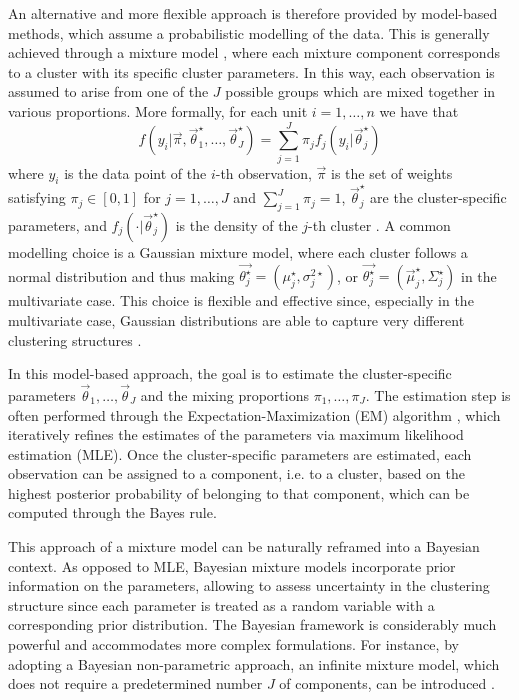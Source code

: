 \documentclass[12pt,	%
	a4paper,		%
	twoside,		%
	openright,		%
	titlepage,%
	]{book}
\theoremstyle{definition}
\let\cite\citep
\begin{document}
An alternative and more flexible approach is therefore provided by model-based methods, which assume a probabilistic modelling of the data. This is generally achieved through a mixture model \cite{mixture-1} \cite{mixture-2} \cite{mixture-3}, where each mixture component corresponds to a cluster with its specific cluster parameters. In this way, each observation is assumed to arise from one of the $J$ possible groups which are mixed together in various proportions. More formally, for each unit $i=1,\ldots,n$ we have that
\begin{equation*}
f(y_i|\vec{\pi},\vec{\theta}^\star_1, \ldots, \vec{\theta}^\star_J)  = \sum_{j=1}^J \pi_j f_j(y_i|\vec{\theta}^\star_j) 
\end{equation*}
where $y_i$ is the data point of the $i$-th observation, $\vec{\pi}$ is the set of weights satisfying $\pi_j \in [0,1]$ for $j=1,\ldots,J$ and $\sum_{j=1}^J \pi_j=1$, $\vec{\theta}_j^\star$ are the cluster-specific parameters, and $f_j(\cdot|\vec{\theta}_j^\star)$ is the density of the $j$-th cluster \cite{paper-33}. A common modelling choice is a Gaussian mixture model, where each cluster follows a normal distribution and thus making $\vec{\theta_j^\star} = (\mu_j^\star, \sigma^{2\star}_j)$, or $\vec{\theta_j^\star} = (\vec{\mu}_j^\star, \Sigma^{\star}_j)$ in the multivariate case. This choice is flexible and effective since, especially in the multivariate case, Gaussian distributions are able to capture very different clustering structures \cite{paper-36}.

In this model-based approach, the goal is to estimate the cluster-specific parameters $\vec{\theta}_1, \ldots, \vec{\theta}_J$ and the mixing proportions $\pi_1, \ldots, \pi_J$. The estimation step is often performed through the Expectation-Maximization (EM) algorithm \cite{EM-2} \cite{EM-1}, which iteratively refines the estimates of the parameters via maximum likelihood estimation (MLE). Once the cluster-specific parameters are estimated, each observation can be assigned to a component, i.e. to a cluster, based on the highest posterior probability of belonging to that component, which can be computed through the Bayes rule.

This approach of a mixture model can be naturally reframed into a Bayesian context. As opposed to MLE, Bayesian mixture models incorporate prior information on the parameters, allowing to assess uncertainty in the clustering structure \cite{paper-34} since each parameter is treated as a random variable with a corresponding prior distribution. The Bayesian framework is considerably much powerful and accommodates more complex formulations. For instance, by adopting a Bayesian non-parametric approach, an infinite mixture model, which does not require a predetermined number $J$ of components, can be introduced \cite{paper-33}.
\end{document}
